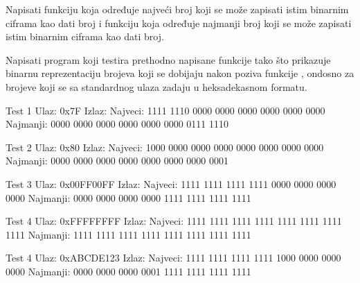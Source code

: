 \begin{Exercise}[label=203]
Napisati funkciju  koja određuje najveći broj koji se može zapisati istim binarnim ciframa kao dati broj i funkciju  koja određuje najmanji broj koji se može zapisati istim binarnim ciframa kao dati broj.

Napisati program koji testira prethodno napisane funkcije tako što prikazuje binarnu reprezentaciju brojeva koji se dobijaju nakon poziva funkcije , ondosno  za brojeve koji se sa standardnog ulaza zadaju u heksadekasnom formatu. 

\begin{maxitest}
\begin{test}{Test 1}
Ulaz:   0x7F  
Izlaz:  
 Najveci:
 1111 1110 0000 0000 0000 0000 0000 0000  
 Najmanji:
 0000 0000 0000 0000 0000 0000 0111 1110
\end{test}
\end{maxitest}

\begin{maxitest}
\begin{test}{Test 2}
Ulaz:   0x80
Izlaz:  
 Najveci:
 1000 0000 0000 0000 0000 0000 0000 0000  
 Najmanji:
 0000 0000 0000 0000 0000 0000 0000 0001
\end{test}
\end{maxitest}

\begin{maxitest}
\begin{test}{Test 3}
Ulaz:   0x00FF00FF
Izlaz:  
 Najveci:
 1111 1111 1111 1111 0000 0000 0000 0000  
 Najmanji:
 0000 0000 0000 0000 1111 1111 1111 1111
\end{test}
\end{maxitest}

\begin{maxitest}
\begin{test}{Test 4}
Ulaz:   0xFFFFFFFF
Izlaz:  
 Najveci:
 1111 1111 1111 1111 1111 1111 1111 1111   
 Najmanji:
 1111 1111 1111 1111 1111 1111 1111 1111
\end{test}
\end{maxitest}

\begin{maxitest}
\begin{test}{Test 4}
Ulaz:   0xABCDE123
Izlaz:  
 Najveci:
 1111 1111 1111 1111 1000 0000 0000 0000  
 Najmanji:
 0000 0000 0000 0001 1111 1111 1111 1111
\end{test}
\end{maxitest}

\end{Exercise}
\begin{Answer}[ref=203]
\end{Answer}


